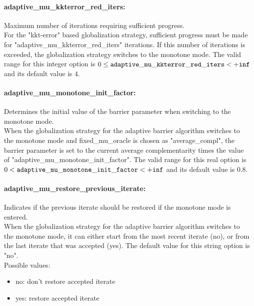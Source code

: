 \paragraph{adaptive\_mu\_kkterror\_red\_iters:}\label{sec:adaptive_mu_kkterror_red_iters} Maximum number of iterations requiring sufficient progress. $\;$ \\
 For the "kkt-error" based globalization strategy,
sufficient progress must be made for
"adaptive\_mu\_kkterror\_red\_iters" iterations.
If this number of iterations is exceeded, the
globalization strategy switches to the monotone
mode. The valid range for this integer option is
$0 \le {\tt adaptive\_mu\_kkterror\_red\_iters } <  {\tt +inf}$
and its default value is $4$.


\paragraph{adaptive\_mu\_monotone\_init\_factor:}\label{sec:adaptive_mu_monotone_init_factor} Determines the initial value of the barrier parameter when switching to the monotone mode. $\;$ \\
 When the globalization strategy for the adaptive
barrier algorithm switches to the monotone mode
and fixed\_mu\_oracle is chosen as
"average\_compl", the barrier parameter is set to
the current average complementarity times the
value of "adaptive\_mu\_monotone\_init\_factor". The valid range for this real option is 
$0 <  {\tt adaptive\_mu\_monotone\_init\_factor } <  {\tt +inf}$
and its default value is $0.8$.


\paragraph{adaptive\_mu\_restore\_previous\_iterate:}\label{sec:adaptive_mu_restore_previous_iterate} Indicates if the previous iterate should be restored if the monotone mode is entered. $\;$ \\
 When the globalization strategy for the adaptive
barrier algorithm switches to the monotone mode,
it can either start from the most recent iterate
(no), or from the last iterate that was accepted
(yes).
The default value for this string option is "no".
\\ 
Possible values:
\begin{itemize}
   \item no: don't restore accepted iterate
   \item yes: restore accepted iterate
\end{itemize}

